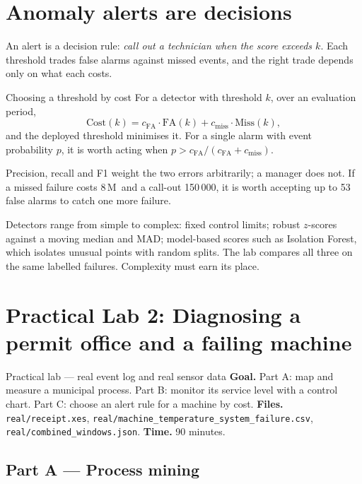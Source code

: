 \section{Anomaly alerts are decisions}
An alert is a decision rule: \emph{call out a technician when the score exceeds $k$}. Each threshold trades false
alarms against missed events, and the right trade depends only on what each costs.

\begin{keyformula}{Choosing a threshold by cost}
For a detector with threshold $k$, over an evaluation period,
\[ \text{Cost}(k) = c_{\text{FA}}\cdot \text{FA}(k) + c_{\text{miss}}\cdot \text{Miss}(k), \]
and the deployed threshold minimises it. For a single alarm with event probability $p$, it is worth acting when
$p > c_{\text{FA}}/(c_{\text{FA}}+c_{\text{miss}})$.
\end{keyformula}
Precision, recall and F1 weight the two errors arbitrarily; a manager does not. If a missed failure costs 8\,M\xaf\ and
a call-out 150\,000\xaf, it is worth accepting up to 53 false alarms to catch one more failure.

Detectors range from simple to complex: fixed control limits; robust $z$-scores against a moving median and MAD;
model-based scores such as Isolation Forest, which isolates unusual points with random splits. The lab compares all
three on the same labelled failures. Complexity must earn its place.

\section{Practical Lab 2: Diagnosing a permit office and a failing machine}
\begin{labbox}{Practical lab --- real event log and real sensor data}
\textbf{Goal.} Part A: map and measure a municipal process. Part B: monitor its service level with a control chart.
Part C: choose an alert rule for a machine by cost. \textbf{Files.} \texttt{real/receipt.xes},
\texttt{real/machine\_temperature\_system\_failure.csv}, \texttt{real/combined\_windows.json}. \textbf{Time.} 90 minutes.
\end{labbox}

\subsection*{Part A --- Process mining}

